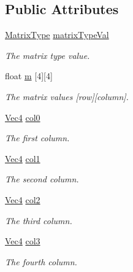 \subsection*{Public Attributes}
\begin{DoxyCompactItemize}
\item 
\hypertarget{classgfxmath_1_1_mat44_a523cda94e6f5b2df5276d821b3471605}{}\hyperlink{group___s_i_s_d_mat_math_ga6c8951c82aec5015dd6806affb4c8d03}{Matrix\+Type} \hyperlink{classgfxmath_1_1_mat44_a523cda94e6f5b2df5276d821b3471605}{matrix\+Type\+Val}\label{classgfxmath_1_1_mat44_a523cda94e6f5b2df5276d821b3471605}

\begin{DoxyCompactList}\small\item\em The matrix type value. \end{DoxyCompactList}\item 
float \hyperlink{classgfxmath_1_1_mat44_a59a6195e1c74aee94b3434b9fed8aa7a}{m} \mbox{[}4\mbox{]}\mbox{[}4\mbox{]}
\begin{DoxyCompactList}\small\item\em The matrix values \mbox{[}row\mbox{]}\mbox{[}column\mbox{]}. \end{DoxyCompactList}\item 
\hyperlink{classgfxmath_1_1_vec4}{Vec4} \hyperlink{classgfxmath_1_1_mat44_a14a9f934c2487a5dd9e4702a0b539cb4}{col0}
\begin{DoxyCompactList}\small\item\em The first column. \end{DoxyCompactList}\item 
\hyperlink{classgfxmath_1_1_vec4}{Vec4} \hyperlink{classgfxmath_1_1_mat44_a9ac4cf40ac05a9ad94964d247d8256e1}{col1}
\begin{DoxyCompactList}\small\item\em The second column. \end{DoxyCompactList}\item 
\hyperlink{classgfxmath_1_1_vec4}{Vec4} \hyperlink{classgfxmath_1_1_mat44_aa810627c4b5df8432b36befdd4649763}{col2}
\begin{DoxyCompactList}\small\item\em The third column. \end{DoxyCompactList}\item 
\hyperlink{classgfxmath_1_1_vec4}{Vec4} \hyperlink{classgfxmath_1_1_mat44_a09c1b1363d41cee3b241cf8843d02289}{col3}
\begin{DoxyCompactList}\small\item\em The fourth column. \end{DoxyCompactList}\end{DoxyCompactItemize}
